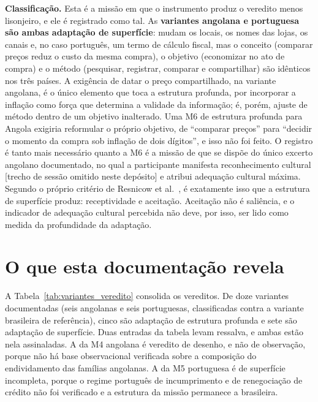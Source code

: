 \noindent\textbf{Classificação.} Esta é a missão em que o instrumento produz o veredito menos lisonjeiro, e ele é registrado como tal. As \textbf{variantes angolana e portuguesa são ambas adaptação de superfície}: mudam os locais, os nomes das lojas, os canais e, no caso português, um termo de cálculo fiscal, mas o conceito (comparar preços reduz o custo da mesma compra), o objetivo (economizar no ato de compra) e o método (pesquisar, registrar, comparar e compartilhar) são idênticos nos três países. A exigência de datar o preço compartilhado, na variante angolana, é o único elemento que toca a estrutura profunda, por incorporar a inflação como força que determina a validade da informação; é, porém, ajuste de método dentro de um objetivo inalterado. Uma M6 de estrutura profunda para Angola exigiria reformular o próprio objetivo, de ``comparar preços'' para ``decidir o momento da compra sob inflação de dois dígitos'', e isso não foi feito. O registro é tanto mais necessário quanto a M6 é a missão de que se dispõe do único excerto angolano documentado, no qual a participante manifesta reconhecimento cultural [trecho de sessão omitido neste depósito] e atribui adequação cultural máxima. Segundo o próprio critério de Resnicow et al.~\cite{resnicow1999}, é exatamente isso que a estrutura de superfície produz: receptividade e aceitação. Aceitação não é saliência, e o indicador de adequação cultural percebida não deve, por isso, ser lido como medida da profundidade da adaptação.

\section*{O que esta documentação revela}

A Tabela~\ref{tab:variantes_veredito} consolida os vereditos. De doze variantes documentadas (seis angolanas e seis portuguesas, classificadas contra a variante brasileira de referência), cinco são adaptação de estrutura profunda e sete são adaptação de superfície. Duas entradas da tabela levam ressalva, e ambas estão nela assinaladas. A da M4 angolana é veredito de desenho, e não de observação, porque não há base observacional verificada sobre a composição do endividamento das famílias angolanas. A da M5 portuguesa é de superfície incompleta, porque o regime português de incumprimento e de renegociação de crédito não foi verificado e a estrutura da missão permanece a brasileira.


